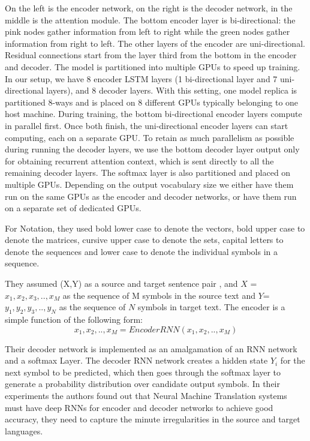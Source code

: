 On the left
is the encoder network, on the right is the decoder network, in the middle is the attention module. The
bottom encoder layer is bi-directional: the pink nodes gather information from left to right while the green
nodes gather information from right to left. The other layers of the encoder are uni-directional. Residual
connections start from the layer third from the bottom in the encoder and decoder. The model is partitioned
into multiple GPUs to speed up training. In our setup, we have 8 encoder LSTM layers (1 bi-directional layer
and 7 uni-directional layers), and 8 decoder layers. With this setting, one model replica is partitioned 8-ways
and is placed on 8 different GPUs typically belonging to one host machine. During training, the bottom
bi-directional encoder layers compute in parallel first. Once both finish, the uni-directional encoder layers
can start computing, each on a separate GPU. To retain as much parallelism as possible during running
the decoder layers, we use the bottom decoder layer output only for obtaining recurrent attention context,
which is sent directly to all the remaining decoder layers. The softmax layer is also partitioned and placed on
multiple GPUs. Depending on the output vocabulary size we either have them run on the same GPUs as the
encoder and decoder networks, or have them run on a separate set of dedicated GPUs.

For Notation, they used bold lower case to denote the vectors, bold upper case to denote the matrices, cursive upper case to denote the sets, capital letters to denote the sequences and lower case to denote the individual symbols in a sequence. 

They assumed (X,Y) as a source and target sentence pair , and $X$ = $x_1,x_2,x_3,..,x_M$ as the sequence of M symbols in the source text and $Y$= $y_1,y_2,y_3,.., y_N$ as the sequence of $N$ symbols in target text. The encoder is a simple function of the following form:
$$x_1,x_2,..,x_M = EncoderRNN(x_1,x_2,..,x_M)$$

Their decoder network is implemented as an amalgamation of an RNN network and a softmax Layer. The decoder RNN network creates a hidden state $Y_i$ for the next symbol to be predicted, which then goes through the softmax layer to generate a probability distribution over candidate output symbols. In their experiments the authors found out that Neural Machine Translation systems must have deep RNNs for encoder and decoder networks to achieve good accuracy, they need to capture the minute irregularities in the source and target languages. 


